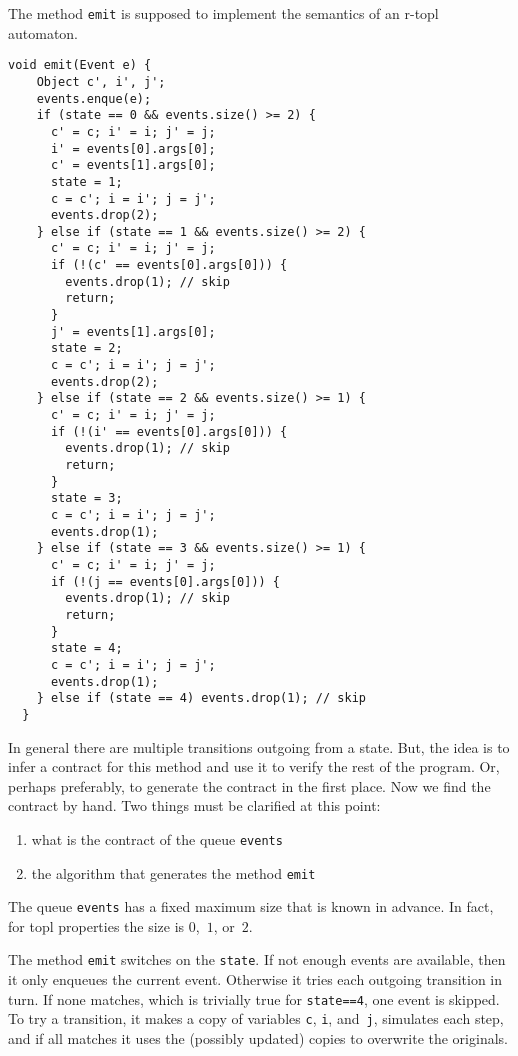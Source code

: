 \documentclass{article} %
\begin{document}
The method {\tt emit} is supposed to implement the semantics of an r-topl automaton.
\begin{Verbatim}[fontsize=\footnotesize]
  void emit(Event e) {
    Object c', i', j';
    events.enque(e);
    if (state == 0 && events.size() >= 2) {
      c' = c; i' = i; j' = j;
      i' = events[0].args[0];
      c' = events[1].args[0];
      state = 1;
      c = c'; i = i'; j = j';
      events.drop(2);
    } else if (state == 1 && events.size() >= 2) {
      c' = c; i' = i; j' = j;
      if (!(c' == events[0].args[0])) {
        events.drop(1); // skip
        return;
      }
      j' = events[1].args[0];
      state = 2;
      c = c'; i = i'; j = j';
      events.drop(2);
    } else if (state == 2 && events.size() >= 1) {
      c' = c; i' = i; j' = j;
      if (!(i' == events[0].args[0])) {
        events.drop(1); // skip
        return;
      }
      state = 3;
      c = c'; i = i'; j = j';
      events.drop(1);
    } else if (state == 3 && events.size() >= 1) {
      c' = c; i' = i; j' = j;
      if (!(j == events[0].args[0])) {
        events.drop(1); // skip
        return;
      }
      state = 4;
      c = c'; i = i'; j = j';
      events.drop(1);
    } else if (state == 4) events.drop(1); // skip
  }
\end{Verbatim}
In general there are multiple transitions outgoing from a state.
But, the idea is to infer a contract for this method and use it to verify the rest of the program.
Or, perhaps preferably, to generate the contract in the first place.
Now we find the contract by hand.
Two things must be clarified at this point:
\begin{enumerate}
\item what is the contract of the queue {\tt events}
\item the algorithm that generates the method {\tt emit}
\end{enumerate}

The queue {\tt events} has a fixed maximum size that is known in advance.
In fact, for topl properties the size is $0$,~$1$, or~$2$.

The method {\tt emit} switches on the {\tt state}.
If not enough events are available, then it only enqueues the current event.
Otherwise it tries each outgoing transition in turn.
If none matches, which is trivially true for {\tt state==4}, one event is skipped.
To try a transition, it makes a copy of variables {\tt c}, {\tt i}, and~{\tt j}, simulates each step, and if all matches it uses the (possibly updated) copies to overwrite the originals.
\end{document}
